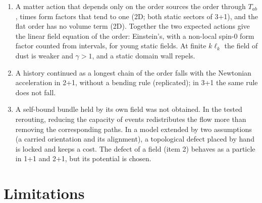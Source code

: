\begin{enumerate}
  leading order the sectors differ.
\item A matter action that depends only on the order sources the order through $T_{ab}$, times form factors that
  tend to one (2D; both static sectors of 3+1), and the flat order has no volume term (2D). Together the two
  expected actions give the linear field equation of the order: Einstein's, with a non-local spin-0 form factor
  counted from intervals, for young static fields. At finite $k\ell_k$ the field of dust is weaker and $\gamma>1$,
  and a static domain wall repels.
\item A history continued as a longest chain of the order falls with the Newtonian acceleration in 2+1,
  without a bending rule (replicated); in 3+1 the same rule does not fall.
\item A self-bound bundle held by its own field was not obtained. In the tested rerouting, reducing the
  capacity of events redistributes the flow more than removing the corresponding paths. In a model extended by two assumptions (a carried orientation and its
  alignment), a topological defect placed by hand is locked and keeps a cost. The defect of a field (item 2)
  behaves as a particle in 1+1 and 2+1, but its potential is chosen.
\end{enumerate}

\section{Limitations}\label{sec:limitations}

